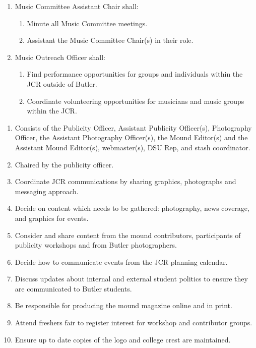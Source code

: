 \begin{enumerate}
\begin{enumerate}
\begin{enumerate}
        \end{enumerate}
        \item Music Committee Assistant Chair shall:
        \begin{enumerate}
            \item Minute all Music Committee meetings. 
            \item Assistant the Music Committee Chair(s) in their role.
        \end{enumerate}
        \item Music Outreach Officer shall:
        \begin{enumerate}
            \item  Find performance opportunities for groups and individuals within the JCR outside of Butler.
            \item Coordinate volunteering opportunities for musicians and music groups within the JCR.
        \end{enumerate}
    \end{enumerate}
\end{enumerate}


\begin{enumerate}
    \item Consists of the Publicity Officer, Assistant Publicity Officer(s), Photography Officer, the Assistant Photography Officer(s), the Mound Editor(s) and the Assistant Mound Editor(s), webmaster(s), DSU Rep, and stash coordinator. 
    \item Chaired by the publicity officer.
    \item Coordinate JCR communications by sharing graphics, photographs and messaging approach.
    \item Decide on content which needs to be gathered: photography, news coverage, and graphics for events.
    \item Consider and share content from the mound contributors, participants of publicity workshops and from Butler photographers.
    \item Decide how to communicate events from the JCR planning calendar.
    \item Discuss updates about internal and external student politics to ensure they are communicated to Butler students.
    \item Be responsible for producing the mound magazine online and in print.
    \item Attend freshers fair to register interest for workshop and contributor groups.
    \item Ensure up to date copies of the logo and college crest are maintained. 
\end{enumerate}

